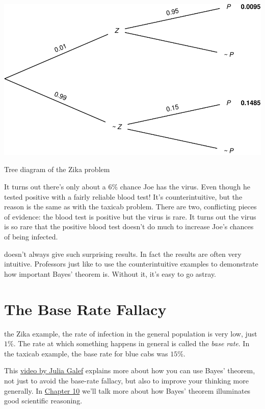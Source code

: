 \documentclass[justified]{tufte-book}
\theoremstyle{definition}
\theoremstyle{definition}
\theoremstyle{definition}
\theoremstyle{remark}
\begin{document}
\begin{marginfigure}
\includegraphics{_main_files/figure-latex/zikatree-1} \caption[Tree diagram of the Zika problem]{Tree diagram of the Zika problem}\label{fig:zikatree}
\end{marginfigure}

It turns out there's only about a \(6\%\) chance Joe has the virus. Even though he tested positive with a fairly reliable blood test! It's counterintuitive, but the reason is the same as with the taxicab problem. There are two, conflicting pieces of evidence: the blood test is positive but the virus is rare. It turns out the virus is so rare that the positive blood test doesn't do much to increase Joe's chances of being infected.

 doesn't always give such surprising results. In fact the results are often very intuitive. Professors just like to use the counterintuitive examples to demonstrate how important Bayes' theorem is. Without it, it's easy to go astray.

\hypertarget{baserate}{%
\section{The Base Rate Fallacy}\label{baserate}}

 the Zika example, the rate of infection in the general population is very low, just \(1\%\). The rate at which something happens in general is called the \emph{base rate}. In the taxicab example, the base rate for blue cabs was \(15\%\).

\begin{marginfigure}
This \href{https://www.youtube.com/watch?v=BrK7X_XlGB8}{video by Julia
Galef} explains more about how you can use Bayes' theorem, not just to
avoid the base-rate fallacy, but also to improve your thinking more
generally. In \protect\hyperlink{bayesibe}{Chapter 10} we'll talk more
about how Bayes' theorem illuminates good scientific reasoning.
\end{marginfigure}
\end{document}
